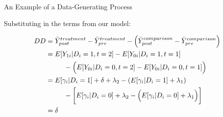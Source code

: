 \documentclass[10pt,xcolor=table,ignorenonframetext,handout,aspectratio=169]{beamer}
\begin{document}
\begin{frame}{An Example of a Data-Generating Process}


\medskip
Substituting in the terms from our model:
\begin{small}
	\begingroup
	\addtolength{\jot}{1em}
	\begin{align*}
	DD &= \textcolor{black}{\bar{Y}^{treatment}_{post}} - \textcolor{black}{\bar{Y}^{treatment}_{pre}}
	 - \left( \textcolor{black}{\bar{Y}^{comparison}_{post}} - \textcolor{black}{\bar{Y}^{comparison}_{pre}} \right) \\
	&= \textcolor{black}{E [ Y_{1i} \vert D_i = 1, t = 2 ]}  - \textcolor{black}{E [ Y_{0i} \vert D_i = 1, t = 1 ]} \\
	& \ \ \ \ \ \ \ \ - \Big( \textcolor{black}{E [ Y_{0i} \vert D_i = 0, t = 2 ]} - \textcolor{black}{E [ Y_{0i} \vert D_i = 0, t = 1 ]} \Big) \\
	&= \textcolor{black}{E [ \gamma_i \vert D_i = 1 ]} + \textcolor{black}{\delta} + \textcolor{black}{\lambda_2} 
	- \left( \textcolor{black}{E [ \gamma_i \vert D_i = 1 ]} + \textcolor{black}{\lambda_1} \right) \\
	& \ \ \ \ \ \ \ \ - \bigg[ \textcolor{black}{E [ \gamma_i \vert D_i = 0 ]} + \textcolor{black}{\lambda_2} - \Big( \textcolor{black}{E [ \gamma_i \vert D_i = 0 ]} + \textcolor{black}{\lambda_1} \Big) \bigg] \\
	&= \delta
	\end{align*}
	\endgroup
\end{small}

\end{frame}



\end{document}
